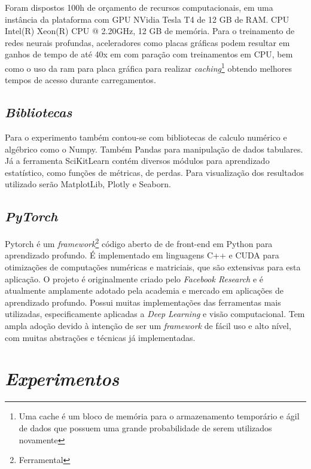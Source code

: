 Foram dispostos 100h de orçamento de recursos computacionais, em uma instância da plataforma com GPU NVidia Tesla T4 de 12 GB de RAM. CPU Intel(R) Xeon(R) CPU @ 2.20GHz, 12 GB de memória. Para o treinamento de redes neurais profundas, aceleradores como placas gráficas podem resultar em ganhos de tempo de até 40x em com paração com treinamentos em CPU, bem como o uso da ram para placa gráfica para realizar \textit{caching}\footnote[1]{Uma cache é um bloco de memória para o armazenamento temporário e ágil de dados que possuem uma grande probabilidade de serem utilizados novamente} obtendo melhores tempos de acesso durante carregamentos.


\subsection{\textit{Bibliotecas}}\label{sec:Cap2_NumpyPandas}

Para o experimento também contou-se com bibliotecas de calculo numérico e algébrico como o Numpy. Também Pandas para manipulação de dados tabulares. Já a ferramenta SciKitLearn contém diversos módulos para aprendizado estatístico, como funções de métricas, de perdas. Para visualização dos resultados utilizado serão MatplotLib, Plotly e Seaborn.

\subsection{\textit{PyTorch}}\label{sec:Cap2_PyTorch}
Pytorch é um \textit{framework}\footnote{Ferramental} código aberto de de front-end em Python para aprendizado profundo. É implementado em linguagens C++ e CUDA para otimizações de computações numéricas e matriciais, que são extensivas para esta aplicação.
O projeto é originalmente criado pelo \textit{Facebook Research} e é atualmente amplamente adotado pela academia e mercado em aplicações de aprendizado profundo. Possui muitas implementações das ferramentas mais utilizadas, especificamente aplicadas a \textit{Deep Learning} e visão computacional. Tem ampla adoção devido à intenção de ser um \textit{framework} de fácil uso e alto nível, com muitas abstrações e técnicas já implementadas.



\section{\textit{Experimentos}}\label{sec:Cap3_Experimentos}

